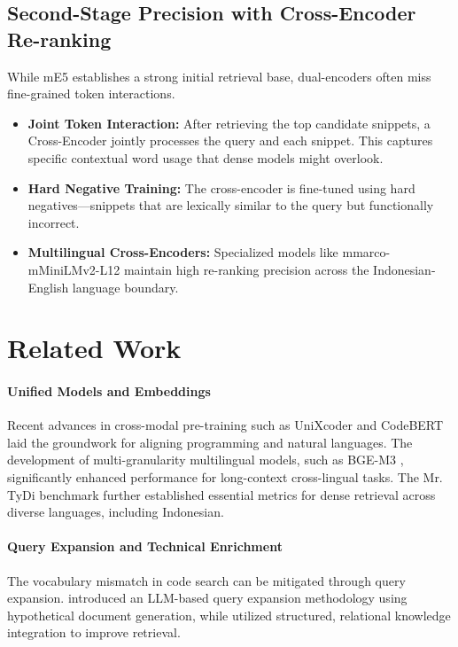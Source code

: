 \documentclass[11pt]{article}
\begin{document}
\subsection{Second-Stage Precision with Cross-Encoder Re-ranking}
While mE5 establishes a strong initial retrieval base, dual-encoders often miss fine-grained token interactions.
\begin{itemize}
    \item \textbf{Joint Token Interaction:} After retrieving the top candidate snippets, a Cross-Encoder jointly processes the query and each snippet. This captures specific contextual word usage that dense models might overlook.
    \item \textbf{Hard Negative Training:} The cross-encoder is fine-tuned using hard negatives---snippets that are lexically similar to the query but functionally incorrect.
    \item \textbf{Multilingual Cross-Encoders:} Specialized models like mmarco-mMiniLMv2-L12 maintain high re-ranking precision across the Indonesian-English language boundary.
\end{itemize}

\section{Related Work}

\paragraph{Unified Models and Embeddings}
Recent advances in cross-modal pre-training such as UniXcoder \cite{unixcoder2022} and CodeBERT \cite{codebert2020} laid the groundwork for aligning programming and natural languages. The development of multi-granularity multilingual models, such as BGE-M3 \cite{bgeM32024}, significantly enhanced performance for long-context cross-lingual tasks. The Mr. TyDi benchmark \cite{mrtydi2021} further established essential metrics for dense retrieval across diverse languages, including Indonesian.

\paragraph{Query Expansion and Technical Enrichment}
The vocabulary mismatch in code search can be mitigated through query expansion. \citet{query2doc2023} introduced an LLM-based query expansion methodology using hypothetical document generation, while \citet{kar2024} utilized structured, relational knowledge integration to improve retrieval. 
\end{document}
